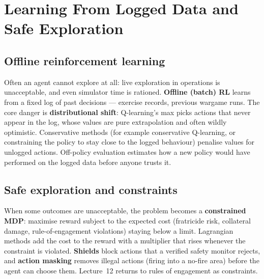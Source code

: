 \documentclass[11pt]{article}
\begin{document}
\section{Learning From Logged Data and Safe Exploration}
\subsection{Offline reinforcement learning}
Often an agent cannot explore at all: live exploration in operations is unacceptable, and even simulator time is rationed. \textbf{Offline (batch) RL} learns from a fixed log of past decisions --- exercise records, previous wargame runs. The core danger is \textbf{distributional shift}: Q-learning's max picks actions that never appear in the log, whose values are pure extrapolation and often wildly optimistic. Conservative methods (for example conservative Q-learning, or constraining the policy to stay close to the logged behaviour) penalise values for unlogged actions. Off-policy evaluation estimates how a new policy would have performed on the logged data before anyone trusts it.
\subsection{Safe exploration and constraints}
When some outcomes are unacceptable, the problem becomes a \textbf{constrained MDP}: maximise reward subject to the expected cost (fratricide risk, collateral damage, rule-of-engagement violations) staying below a limit. Lagrangian methods add the cost to the reward with a multiplier that rises whenever the constraint is violated. \textbf{Shields} block actions that a verified safety monitor rejects, and \textbf{action masking} removes illegal actions (firing into a no-fire area) before the agent can choose them. Lecture~12 returns to rules of engagement as constraints.
\end{document}
